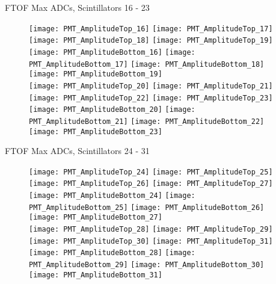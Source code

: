 \documentclass[11pt]{beamer}
\begin{document}
\begin{frame}{FTOF Max ADCs, Scintillators 16 - 23}
\begin{figure}
\centering
\texttt{[image: PMT\_AmplitudeTop\_16]}
\texttt{[image: PMT\_AmplitudeTop\_17]}
\texttt{[image: PMT\_AmplitudeTop\_18]}
\texttt{[image: PMT\_AmplitudeTop\_19]} \\ 
\texttt{[image: PMT\_AmplitudeBottom\_16]}
\texttt{[image: PMT\_AmplitudeBottom\_17]}
\texttt{[image: PMT\_AmplitudeBottom\_18]}
\texttt{[image: PMT\_AmplitudeBottom\_19]} \\
\texttt{[image: PMT\_AmplitudeTop\_20]}
\texttt{[image: PMT\_AmplitudeTop\_21]}
\texttt{[image: PMT\_AmplitudeTop\_22]}
\texttt{[image: PMT\_AmplitudeTop\_23]} \\
\texttt{[image: PMT\_AmplitudeBottom\_20]}
\texttt{[image: PMT\_AmplitudeBottom\_21]}
\texttt{[image: PMT\_AmplitudeBottom\_22]}
\texttt{[image: PMT\_AmplitudeBottom\_23]} \\
\end{figure}
\end{frame}

\begin{frame}{FTOF Max ADCs, Scintillators 24 - 31}
\begin{figure}
\centering
\texttt{[image: PMT\_AmplitudeTop\_24]}
\texttt{[image: PMT\_AmplitudeTop\_25]}
\texttt{[image: PMT\_AmplitudeTop\_26]}
\texttt{[image: PMT\_AmplitudeTop\_27]} \\ 
\texttt{[image: PMT\_AmplitudeBottom\_24]}
\texttt{[image: PMT\_AmplitudeBottom\_25]}
\texttt{[image: PMT\_AmplitudeBottom\_26]}
\texttt{[image: PMT\_AmplitudeBottom\_27]} \\
\texttt{[image: PMT\_AmplitudeTop\_28]}
\texttt{[image: PMT\_AmplitudeTop\_29]}
\texttt{[image: PMT\_AmplitudeTop\_30]}
\texttt{[image: PMT\_AmplitudeTop\_31]} \\
\texttt{[image: PMT\_AmplitudeBottom\_28]}
\texttt{[image: PMT\_AmplitudeBottom\_29]}
\texttt{[image: PMT\_AmplitudeBottom\_30]}
\texttt{[image: PMT\_AmplitudeBottom\_31]} \\
\end{figure}
\end{frame}
\end{document}
